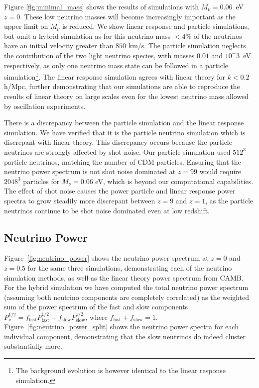 \documentclass[useAMS, usenatbib]{mnras}
\begin{document}
Figure \ref{fig:minimal_mass} shows the results of simulations with $M_\nu = 0.06$~eV $z=0$. These low neutrino masses will become increasingly important as the upper limit on $M_\nu$ is reduced. We show linear response and particle simulations, but omit a hybrid simulation as for this neutrino mass $ < 4\%$ of the neutrinos have an initial velocity greater than $850$ km/s. The particle simulation neglects the contribution of the two light neutrino species, with masses $0.01$ and $10^-3$~eV respectively, as only one neutrino mass state can be followed in a particle simulation\footnote{The background evolution is however identical to the linear response simulation.}. The linear response simulation agrees with linear theory for $k < 0.2$ h/Mpc, further demonstrating that our simulations are able to reproduce the results of linear theory on large scales even for the lowest neutrino mass allowed by oscillation experiments.

There is a discrepancy between the particle simulation and the linear response simulation. We have verified that it is the particle neutrino simulation which is discrepant with linear theory. This discrepancy occurs because the particle neutrinos are strongly affected by shot-noise. Our particle simulation used $512^3$ particle neutrinos, matching the number of CDM particles. Ensuring that the neutrino power spectrum is not shot noise dominated at $z=99$ would require $2048^3$ particles for $M_\nu = 0.06$ eV, which is beyond our computational capabilities. The effect of shot noise causes the power particle and linear response power spectra to grow steadily more discrepant between $z=9$ and $z=1$, as the particle neutrinos continue to be shot noise dominated even at low redshift.

\subsection{Neutrino Power}
\label{sec:nupower}

Figure~\ref{fig:neutrino_power} shows the neutrino power spectrum at $z=0$ and $z=0.5$ for the same three simulations, demonstrating each of the neutrino simulation methods, as well as the linear theory power spectrum from CAMB. For the hybrid simulation we have computed the total neutrino power spectrum (assuming both neutrino components are completely correlated) as the weighted sum of the power spectrum of the fast and slow components $P^{1/2}_\nu = f_\mathrm{fast} P^{1/2}_\mathrm{fast} + f_\mathrm{slow} P^{1/2}_\mathrm{slow}$, where $f_\mathrm{fast} + f_\mathrm{slow} = 1$. Figure~\ref{fig:neutrino_power_split} shows the neutrino power spectra for each individual component, demonstrating that the slow neutrinos do indeed cluster substantially more.
\end{document}
